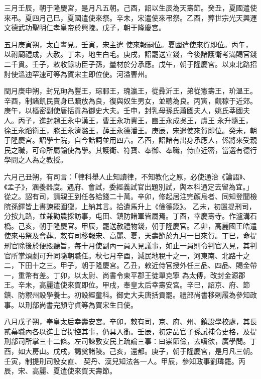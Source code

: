 \begin{pinyinscope}
 三月壬辰，朝于隆慶宮，是月凡五朝。己酉，詔以生辰為天壽節。癸丑，夏國遣使來弔。夏四月己巳，夏國遣使來祭。辛未，宋遣使來弔祭。乙酉，葬世宗光天興運文德武功聖明仁孝皇帝於興陵。戊子，朝于隆慶宮。



 五月庚寅朔，太白晝見。壬寅，宋主遣
 使來報嗣位。夏國遣使來賀即位。丙午，以祔廟禮成，大赦。丁未，地生白毛。庚戌，詔罷送宣錢，今後諸護衛考滿賜官錢二千貫。壬子，敕收錄功臣子孫，量材於分承應。戊午，朝于隆慶宮。以東北路招討使溫迪罕速可等為賀宋主即位使。河溢曹州。



 閏月庚申朔，封兄珣為豐王，琮鄆王，瑰瀛王，從彞沂王，弟從憲壽王，玠溫王。辛酉，制諸飢民賣身已贖放為良，復與奴生男女，並聽為良。丙寅，觀稼于近郊。庚午，以樞密副使唐括貢為御史大夫。壬申，封乳母孫氏蕭國夫人，姚氏莘國夫人。丙子，進封趙王永中漢王，曹王永功冀王，豳王永成吳王，虞王
 永升隨王，徐王永蹈衛王，滕王永濟潞王，薛王永德潘王。庚辰，宋遣使來賀即位。癸未，朝于隆慶宮。詔學士院，自今誥詞並用四六。乙酉，詔諸有出身承應人，係將來受親民之職，可命所屬諭使為學。其護衛、符寶、奉御、奉職，侍直近密，當選有德行學問之人為之教授。



 六月己丑朔，有司言：「律科舉人止知讀律，不知教化之原，必使通治《論語》、《孟子》，涵養器度。遇府、會試，委經義試官出題別試，與本科通定去留為宜。」從之。詔有司，請親王到任各給錢二十萬。辛卯，修起居注完顏烏者、同知登聞檢院孫鐸皆上書諫罷圍獵，上納其言。拾遺馬升上《儉德箴》。
 乙未，初置提刑司，分按九路，並兼勸農採訪事，屯田、鎮防諸軍皆屬焉。丁酉，幸慶壽寺。作瀘溝石橋。己亥，朝于隆慶官。甲辰，罷送赦禮物錢，朝于隆慶官。乙卯，高麗國王皓遣使來弔祭及會葬。敕有司移報宋、高麗、夏，天壽節於九月一日來賀。丁巳，命提刑官除後於便殿聽旨，每十月使副內一員入見議事，如止一員則令判官入見，其判官所掌煩劇可升同隨朝職任。秋七月辛酉，減民地稅十之一，河東南、北路十之二，下田十之三。甲子，朝于隆慶宮。乙丑，敕近侍官授外任三品、四品、賜金帶一，重幣有差。丁卯，以太尉、尚書令東平郡王徒單克寧
 為太傅，改封金源郡王。辛未，高麗遣使來賀即位。甲戌，奉皇太后幸壽安宮。辛巳，詔京、府、節鎮、防禦州設學養士。初設經童科。御史大夫唐括貢罷。禮部尚書移剌履為參知政事。以刑部尚書完顏守貞等為賀宋生日使。



 八月戊子朔，奉皇太后幸壽安宮。辛卯，敕有司，京、府、州、鎮設學校處，其長貳幕職內各以進士官提控其事，仍具入銜。壬辰，初定品官子孫試補令史格，及提刑部司所掌三十二條。左司諫敦安民上疏論三事：曰崇節儉，去嗜欲，廣學問。丁酉，如大房山。戊戌，謁奠諸陵。己亥，還都。庚子，朝于隆慶宮，是月凡三朝。壬寅，制提刑司設女直、
 契丹、漢兒知法各一人。甲辰，參知政事劉瑋罷。丙辰，宋、高麗、夏遣使來賀天壽節。




\end{pinyinscope}
